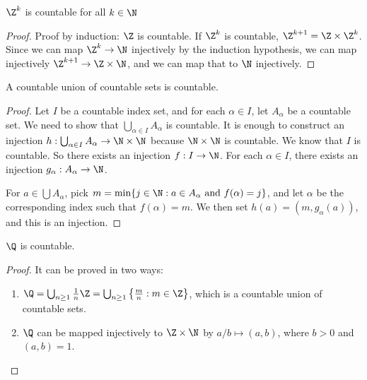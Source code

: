 \documentclass[a4paper]{article}
\begin{document}
\begin{prop}
  $\Z^k$ is countable for all $k\in \N$
\end{prop}

\begin{proof}
  Proof by induction: $\Z$ is countable. If $\Z^k$ is countable, $\Z^{k + 1} = \Z\times \Z^k$. Since we can map $\Z^k \to \N$ injectively by the induction hypothesis, we can map injectively $\Z^{k + 1}\to \Z\times \N$, and we can map that to $\N$ injectively.
\end{proof}

\begin{thm}
  A countable union of countable sets is countable.
\end{thm}

\begin{proof}
  Let $I$ be a countable index set, and for each $\alpha \in I$, let $A_\alpha$ be a countable set. We need to show that $\bigcup_{\alpha\in I} A_\alpha$ is countable. It is enough to construct an injection $h: \bigcup_{\alpha\in I} A_\alpha \to \N\times \N$ because $\N\times\N$ is countable. We know that $I$ is countable. So there exists an injection $f: I\to \N$. For each $\alpha\in I$, there exists an injection $g_\alpha: A_\alpha \to\N$.

  For $a\in \bigcup A_\alpha$, pick $m = \min\{j\in \N: a\in A_{\alpha}\text{ and }f(\alpha) = j\}$, and let $\alpha$ be the corresponding index such that $f(\alpha) = m$. We then set $h(a) = (m, g_\alpha(a))$, and this is an injection.
\end{proof}

\begin{prop}
  $\Q$ is countable.
\end{prop}
\begin{proof}
  It can be proved in two ways:
  \begin{enumerate}
    \item $\Q = \bigcup_{n\geq 1} \frac{1}{n}\Z = \bigcup_{n\geq 1} \left\{\frac{m}{n}: m\in \Z\right\}$, which is a countable union of countable sets.
    \item $\Q$ can be mapped injectively to $\Z\times \N$ by $a/b\mapsto (a, b)$, where $b > 0$ and $(a, b) = 1$.\qedhere
  \end{enumerate}
\end{proof}
\end{document}
